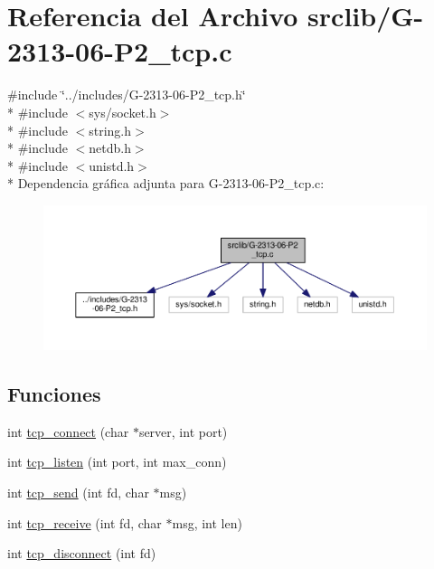 \hypertarget{G-2313-06-P2__tcp_8c}{}\section{Referencia del Archivo srclib/\+G-\/2313-\/06-\/\+P2\+\_\+tcp.c}
\label{G-2313-06-P2__tcp_8c}
{\ttfamily \#include \char`\"{}../includes/\+G-\/2313-\/06-\/\+P2\+\_\+tcp.\+h\char`\"{}}\\*
{\ttfamily \#include $<$sys/socket.\+h$>$}\\*
{\ttfamily \#include $<$string.\+h$>$}\\*
{\ttfamily \#include $<$netdb.\+h$>$}\\*
{\ttfamily \#include $<$unistd.\+h$>$}\\*
Dependencia gráfica adjunta para G-\/2313-\/06-\/\+P2\+\_\+tcp.c\+:\nopagebreak
\begin{figure}[H]
\begin{center}
\leavevmode
\includegraphics[width=350pt]{G-2313-06-P2__tcp_8c__incl}
\end{center}
\end{figure}
\subsection*{Funciones}
\begin{DoxyCompactItemize}
\item 
int \hyperlink{G-2313-06-P2__tcp_8c_a4e5ce422aa030ac8b3998e858b79cae2}{tcp\+\_\+connect} (char $\ast$server, int port)
\item 
int \hyperlink{G-2313-06-P2__tcp_8c_a14d727cfbcd2ce3c5f4fae5a470a84da}{tcp\+\_\+listen} (int port, int max\+\_\+conn)
\item 
int \hyperlink{G-2313-06-P2__tcp_8c_a1e2b75e457a02f23d433a6821f6902b7}{tcp\+\_\+send} (int fd, char $\ast$msg)
\item 
int \hyperlink{G-2313-06-P2__tcp_8c_af3354e60e1181adcd72f9f242063fafe}{tcp\+\_\+receive} (int fd, char $\ast$msg, int len)
\item 
int \hyperlink{G-2313-06-P2__tcp_8c_a2d1f9e76e5da3a7c1e172d1294a33611}{tcp\+\_\+disconnect} (int fd)
\end{DoxyCompactItemize}


